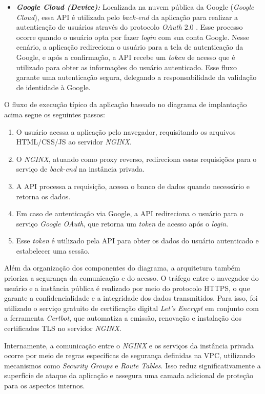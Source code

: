 \begin{itemize}
  \item \textbf{\textit{Google Cloud (Device):}} Localizada na nuvem pública da Google (\textit{Google Cloud}), essa API é utilizada pelo \emph{back-end} da aplicação para realizar a autenticação de usuários através do protocolo \emph{OAuth} 2.0 \cite{GoogleOAuth}. Esse processo ocorre quando o usuário opta por fazer \emph{login} com sua conta Google. Nesse cenário, a aplicação redireciona o usuário para a tela de autenticação da Google, e após a confirmação, a API recebe um \textit{token} de acesso que é utilizado para obter as informações do usuário autenticado. Esse fluxo garante uma autenticação segura, delegando a responsabilidade da validação de identidade à Google.
\end{itemize}

O fluxo de execução típico da aplicação baseado no diagrama de implantação acima segue os seguintes passos:
\begin{enumerate}
  \item O usuário acessa a aplicação pelo navegador, requisitando os arquivos HTML/CSS/JS ao servidor \emph{NGINX}.
  \item O \emph{NGINX}, atuando como proxy reverso, redireciona essas requisições para o serviço de \emph{back-end} na instância privada.
  \item A API processa a requisição, acessa o banco de dados quando necessário e retorna os dados.
  \item Em caso de autenticação via Google, a API redireciona o usuário para o serviço \emph{Google OAuth}, que retorna um \emph{token} de acesso após o \emph{login}.
  \item Esse \emph{token} é utilizado pela API para obter os dados do usuário autenticado e estabelecer uma sessão.
\end{enumerate}

Além da organização dos componentes do diagrama, a arquitetura também prioriza a segurança da comunicação e do acesso. O tráfego entre o navegador do usuário e a instância pública é realizado por meio do protocolo HTTPS, o que garante a confidencialidade e a integridade dos dados transmitidos. Para isso, foi utilizado o serviço gratuito de certificação digital \emph{Let's Encrypt} em conjunto com a ferramenta \emph{Certbot}, que automatiza a emissão, renovação e instalação dos certificados TLS no servidor \emph{NGINX}.

Internamente, a comunicação entre o \emph{NGINX} e os serviços da instância privada ocorre por meio de regras específicas de segurança definidas na VPC, utilizando mecanismos como \textit{Security Groups} e \textit{Route Tables}. Isso reduz significativamente a superfície de ataque da aplicação e assegura uma camada adicional de proteção para os aspectos internos.

